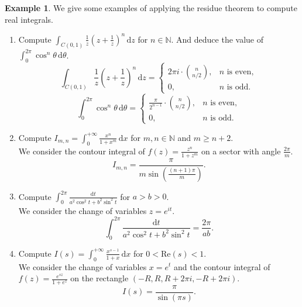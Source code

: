 \documentclass{article}
\theoremstyle{definition}
\newtheorem{example}[theorem]{Example}
\newcommand{\N}{\mathbb{N}}
\newcommand{\dd}{\mathrm{d}}
\newcommand{\re}{\mathrm{Re}}
\renewcommand{\geq}{\geqslant}
\begin{document}
\begin{example}
    We give some examples of applying the residue theorem to compute real integrals. 
    \begin{enumerate}
        \item Compute \(\int_{C(0,1)} \frac{1}{z}\left(z+\frac{1}{z}\right)^n\, \dd z\) for \(n\in\N\). And deduce the value of \(\int_0^{2\pi} \cos^n \theta\, \dd \theta\).
            \begin{equation*}
                \int_{C(0,1)} \frac{1}{z}\left(z+\frac{1}{z}\right)^n\, \dd z = \begin{cases}
                    2\pi i \cdot \binom{n}{n/2}, & n\text{ is even},\\
                    0, & n\text{ is odd}.
                \end{cases}
            \end{equation*}
            \begin{equation*}
                \int_0^{2\pi} \cos^n \theta\, \dd \theta = \begin{cases}
                    \frac{\pi}{2^{n-1}}\cdot \binom{n}{n/2}, & n\text{ is even},\\
                    0, & n\text{ is odd}.
                \end{cases}
            \end{equation*}
        \item Compute $I_{m,n}=\int_{0}^{+\infty}\frac{x^n}{1+x^m}\, \dd x$ for $m,n\in \N$ and $m\geq n+2$.\\
        We consider the contour integral of $f(z)=\frac{z^n}{1+z^m}$ on a sector with angle $\frac{2\pi}{m}$.
            \begin{equation*}
                I_{m,n} = \frac{\pi}{m\sin\left(\frac{(n+1)\pi}{m}\right)}.
            \end{equation*}
        \item Compute $\int_{0}^{2\pi} \frac{\dd t}{a^2\cos^2 t+b^2\sin^2 t}$ for $a>b>0$.\\
        We consider the change of variables $z=e^{it}$.
            \begin{equation*}
                    \int_{0}^{2\pi} \frac{\dd t}{a^2\cos^2 t+b^2\sin^2 t} = \frac{2\pi}{ab}.
            \end{equation*}
        \item Compute $I(s)=\int_{0}^{+\infty}\frac{x^{s-1}}{1+x}\,\dd x$ for $0<\re(s)<1$.\\
        We consider the change of variables $x=e^{t}$ and the contour integral of $f(z)=\frac{e^{sz}}{1+e^z}$ on the rectangle $(-R,R,R+2\pi i,-R+2\pi i)$.
            \begin{equation*}
                        I(s) = \frac{\pi}{\sin(\pi s)}.
            \end{equation*}
    \end{enumerate}
\end{example}
\end{document}
